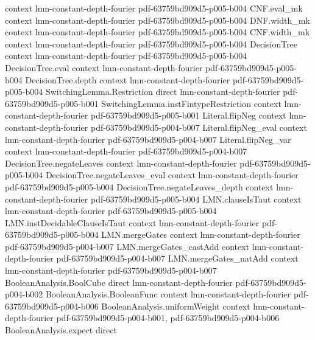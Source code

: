 \begin{lemma}
  {context}
  {lmn-constant-depth-fourier}
  {pdf-63759bd909d5-p005-b004}
\proofstep
  {CNF.eval_mk}
  {context}
  {lmn-constant-depth-fourier}
  {pdf-63759bd909d5-p005-b004}
\proofstep
  {DNF.width_mk}
  {context}
  {lmn-constant-depth-fourier}
  {pdf-63759bd909d5-p005-b004}
\proofstep
  {CNF.width_mk}
  {context}
  {lmn-constant-depth-fourier}
  {pdf-63759bd909d5-p005-b004}
\proofstep
  {DecisionTree}
  {context}
  {lmn-constant-depth-fourier}
  {pdf-63759bd909d5-p005-b004}
\proofstep
  {DecisionTree.eval}
  {context}
  {lmn-constant-depth-fourier}
  {pdf-63759bd909d5-p005-b004}
\proofstep
  {DecisionTree.depth}
  {context}
  {lmn-constant-depth-fourier}
  {pdf-63759bd909d5-p005-b004}
\proofstep
  {SwitchingLemma.Restriction}
  {direct}
  {lmn-constant-depth-fourier}
  {pdf-63759bd909d5-p005-b001}
\proofstep
  {SwitchingLemma.instFintypeRestriction}
  {context}
  {lmn-constant-depth-fourier}
  {pdf-63759bd909d5-p005-b001}
\proofstep
  {Literal.flipNeg}
  {context}
  {lmn-constant-depth-fourier}
  {pdf-63759bd909d5-p004-b007}
\proofstep
  {Literal.flipNeg_eval}
  {context}
  {lmn-constant-depth-fourier}
  {pdf-63759bd909d5-p004-b007}
\proofstep
  {Literal.flipNeg_var}
  {context}
  {lmn-constant-depth-fourier}
  {pdf-63759bd909d5-p004-b007}
\proofstep
  {DecisionTree.negateLeaves}
  {context}
  {lmn-constant-depth-fourier}
  {pdf-63759bd909d5-p005-b004}
\proofstep
  {DecisionTree.negateLeaves_eval}
  {context}
  {lmn-constant-depth-fourier}
  {pdf-63759bd909d5-p005-b004}
\proofstep
  {DecisionTree.negateLeaves_depth}
  {context}
  {lmn-constant-depth-fourier}
  {pdf-63759bd909d5-p005-b004}
\proofstep
  {LMN.clauseIsTaut}
  {context}
  {lmn-constant-depth-fourier}
  {pdf-63759bd909d5-p005-b004}
\proofstep
  {LMN.instDecidableClauseIsTaut}
  {context}
  {lmn-constant-depth-fourier}
  {pdf-63759bd909d5-p005-b004}
\proofstep
  {LMN.mergeGates}
  {context}
  {lmn-constant-depth-fourier}
  {pdf-63759bd909d5-p004-b007}
\proofstep
  {LMN.mergeGates_castAdd}
  {context}
  {lmn-constant-depth-fourier}
  {pdf-63759bd909d5-p004-b007}
\proofstep
  {LMN.mergeGates_natAdd}
  {context}
  {lmn-constant-depth-fourier}
  {pdf-63759bd909d5-p004-b007}
\proofstep
  {BooleanAnalysis.BoolCube}
  {direct}
  {lmn-constant-depth-fourier}
  {pdf-63759bd909d5-p004-b002}
\proofstep
  {BooleanAnalysis.BooleanFunc}
  {context}
  {lmn-constant-depth-fourier}
  {pdf-63759bd909d5-p004-b006}
\proofstep
  {BooleanAnalysis.uniformWeight}
  {context}
  {lmn-constant-depth-fourier}
  {pdf-63759bd909d5-p004-b001,
    pdf-63759bd909d5-p004-b006}
\proofstep
  {BooleanAnalysis.expect}
  {direct}

\end{lemma}
